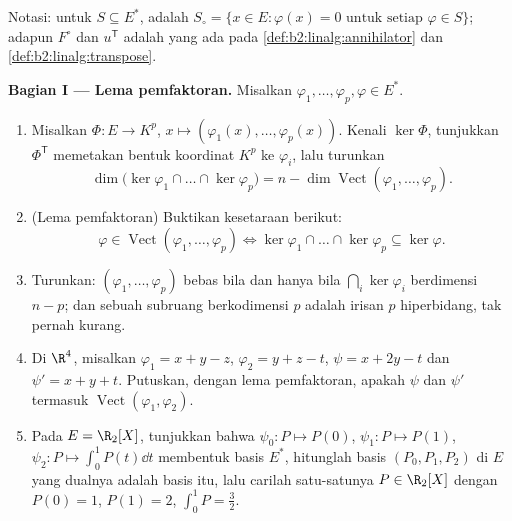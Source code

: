 \begin{problem}
\label{pb:b2:linalg:1}
Notasi: untuk $S \subseteq E^*$, \emph{} adalah
$S_\circ = \{x \in E : \varphi(x) = 0 \text{ untuk setiap } \varphi
\in S\}$; adapun  $F^\circ$ dan  $u^{\mathsf T}$
adalah yang ada pada \cref{def:b2:linalg:annihilator} dan
\cref{def:b2:linalg:transpose}.

\medskip
\noindent\textbf{Bagian I --- Lema pemfaktoran.} Misalkan
$\varphi_1, \dots, \varphi_p, \varphi \in E^*$.
\begin{enumerate}
  \item Misalkan $\Phi \colon E \to K^p$, $x \mapsto (\varphi_1(x),
        \dots, \varphi_p(x))$. Kenali $\ker\Phi$, tunjukkan
        $\Phi^{\mathsf T}$ memetakan bentuk koordinat $K^p$ ke
        $\varphi_i$, lalu turunkan
        \[
        \dim \bigl(\ker\varphi_1 \cap \dots \cap
        \ker\varphi_p\bigr) = n - \dim
        \operatorname{Vect}(\varphi_1, \dots, \varphi_p).
        \]
  \item (Lema pemfaktoran) Buktikan kesetaraan berikut:
        \[
        \varphi \in \operatorname{Vect}(\varphi_1, \dots,
        \varphi_p)
        \iff
        \ker\varphi_1 \cap \dots \cap \ker\varphi_p \subseteq
        \ker\varphi .
        \]
  \item Turunkan: $(\varphi_1, \dots, \varphi_p)$ bebas bila dan hanya
        bila $\bigcap_i \ker\varphi_i$ berdimensi $n - p$; dan sebuah
        subruang berkodimensi $p$ adalah irisan $p$
        hiperbidang, tak pernah kurang.
  \item Di $\R^4$, misalkan $\varphi_1 = x + y - z$, $\varphi_2 = y +
        z - t$, $\psi = x + 2y - t$ dan $\psi' = x + y + t$.
        Putuskan, dengan lema pemfaktoran, apakah $\psi$ dan
        $\psi'$ termasuk $\operatorname{Vect}(\varphi_1,
        \varphi_2)$.
  \item Pada $E = \R_2[X]$, tunjukkan bahwa $\psi_0 \colon P \mapsto
        P(0)$, $\psi_1 \colon P \mapsto P(1)$, $\psi_2 \colon P
        \mapsto \int_0^1 P(t)\dd t$ membentuk basis $E^*$,
        hitunglah basis $(P_0, P_1, P_2)$ di $E$ yang dualnya adalah
        basis itu, lalu carilah satu-satunya $P \in \R_2[X]$ dengan $P(0)
        = 1$, $P(1) = 2$, $\int_0^1 P = \frac32$.
\end{enumerate}


\end{problem}
